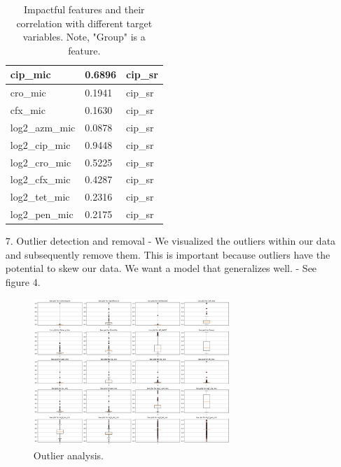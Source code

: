 \documentclass[manuscript,screen,review, nonacm]{acmart}
\begin{document}
\begin{itemize}
\begin{table}[H]
\begin{tabular}{|l|l|l|}
                cip\_mic                   & 0.6896               & cip\_sr         \\ \hline
                cro\_mic                   & 0.1941               & cip\_sr         \\ \hline
                cfx\_mic                   & 0.1630               & cip\_sr         \\ \hline
                log2\_azm\_mic             & 0.0878               & cip\_sr         \\ \hline
                log2\_cip\_mic             & 0.9448               & cip\_sr         \\ \hline
                log2\_cro\_mic             & 0.5225               & cip\_sr         \\ \hline
                log2\_cfx\_mic             & 0.4287               & cip\_sr         \\ \hline
                log2\_tet\_mic             & 0.2316               & cip\_sr         \\ \hline
                log2\_pen\_mic             & 0.2175               & cip\_sr         \\ \hline
                \end{tabular}
                \caption{Impactful features and their correlation with different target variables. Note, "Group" is a feature.}
            \end{table}

    \item[7.] Outlier detection and removal - We visualized the outliers within our data and subsequently remove them. This is important because outliers
    have the potential to skew our data. We want a model that generalizes well. - See figure 4.
            \begin{figure}[H]
                \centering
                \vspace{-10pt}
                \includegraphics[width=0.7\textwidth]{figures/outlier.png}
                \caption{Outlier analysis.}
                \vspace{-10pt}
            \end{figure}


\end{itemize}
\end{document}
